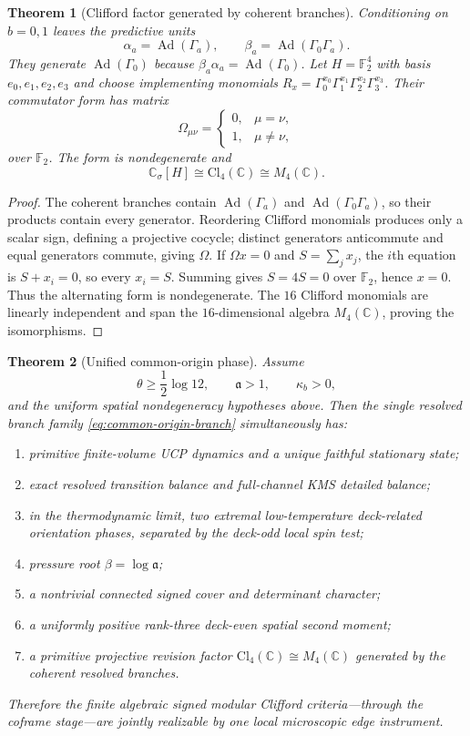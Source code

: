 \documentclass[11pt]{article}
\newtheorem{theorem}{Theorem}[section]
\theoremstyle{definition}
\theoremstyle{remark}
\newcommand{\C}{\mathbb C}
\newcommand{\F}{\mathbb F}
\newcommand{\Ad}{\operatorname{Ad}}
\newcommand{\Cl}{\mathrm{Cl}}
\begin{document}
\begin{theorem}[Clifford factor generated by coherent branches]
\label{thm:common-origin-clifford}
Conditioning on $b=0,1$ leaves the predictive units
\[
 \alpha_a=\Ad(\Gamma_a),
 \qquad
 \beta_a=\Ad(\Gamma_0\Gamma_a).
\]
They generate $\Ad(\Gamma_0)$ because $\beta_a\alpha_a=\Ad(\Gamma_0)$.  Let
$H=\F_2^4$ with basis $e_0,e_1,e_2,e_3$ and choose implementing monomials
$R_x=\Gamma_0^{x_0}\Gamma_1^{x_1}\Gamma_2^{x_2}\Gamma_3^{x_3}$.  Their
commutator form has matrix
\[
 \Omega_{\mu\nu}=
 \begin{cases}0,&\mu=\nu,\\1,&\mu\ne\nu,
 \end{cases}
\]
over $\F_2$.  The form is nondegenerate and
\[
 \C_\sigma[H]\cong\Cl_4(\C)\cong M_4(\C).
\]
\end{theorem}

\begin{proof}
The coherent branches contain $\Ad(\Gamma_a)$ and
$\Ad(\Gamma_0\Gamma_a)$, so their products contain every generator.  Reordering
Clifford monomials produces only a scalar sign, defining a projective cocycle;
distinct generators anticommute and equal generators commute, giving $\Omega$.
If $\Omega x=0$ and $S=\sum_jx_j$, the $i$th equation is $S+x_i=0$, so every
$x_i=S$.  Summing gives $S=4S=0$ over $\F_2$, hence $x=0$.  Thus the alternating
form is nondegenerate.  The $16$ Clifford monomials are linearly independent
and span the $16$-dimensional algebra $M_4(\C)$, proving the isomorphisms.
\end{proof}

\begin{theorem}[Unified common-origin phase]
\label{thm:common-origin-phase}
Assume
\[
 \theta\ge\frac12\log12,
 \qquad \mathfrak a>1,
 \qquad \kappa_b>0,
\]
and the uniform spatial nondegeneracy hypotheses above.  Then the single
resolved branch family \eqref{eq:common-origin-branch} simultaneously has:
\begin{enumerate}[label=\textup{(\roman*)},leftmargin=2.4em]
\item primitive finite-volume UCP dynamics and a unique faithful stationary
      state;
\item exact resolved transition balance and full-channel KMS detailed balance;
\item in the thermodynamic limit, two extremal low-temperature deck-related orientation phases, separated by the deck-odd local spin test;
\item pressure root $\beta=\log\mathfrak a$;
\item a nontrivial connected signed cover and determinant character;
\item a uniformly positive rank-three deck-even spatial second moment;
\item a primitive projective revision factor
      $\Cl_4(\C)\cong M_4(\C)$ generated by the coherent resolved branches.
\end{enumerate}
Therefore the finite algebraic signed modular Clifford criteria---through
the coframe stage---are jointly realizable by one local microscopic edge
instrument.
\end{theorem}
\end{document}
